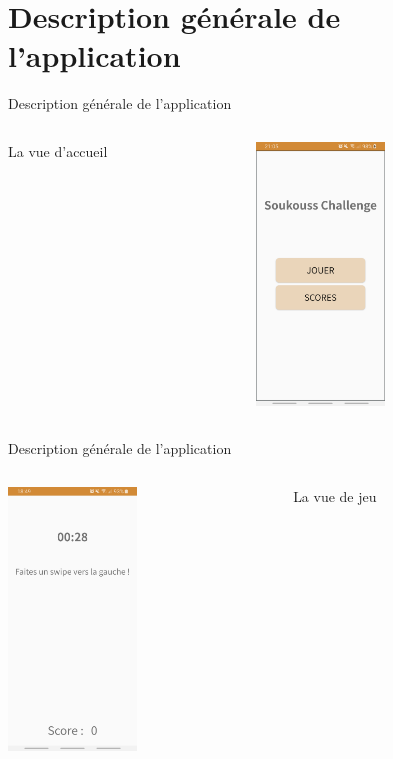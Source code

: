 \documentclass[xcolor=dvipsnames]{beamer}
\begin{document}
\section{Description générale de l'application}

\begin{frame}{Description générale de l'application}
    \begin{columns}[T] 
     \begin{column}[c]{5cm}
     \LARGE{La vue d'accueil}
     \end{column}
     \begin{column}[c]{5cm}
        \begin{center}\includegraphics[height=7cm]{Images/VueAccueil.jpg} \end{center}
     \end{column}
     \end{columns}
\end{frame}

\begin{frame}{Description générale de l'application}
    \begin{columns}[T]
    \begin{column}[c]{5cm}
        \begin{center}\includegraphics[height=7cm]{Images/VueJeu.jpg}
        \end{center}
    \end{column}
    \begin{column}[c]{5cm}
    \LARGE{La vue de jeu}
    \end{column}
    \end{columns}
\end{frame}
\end{document}
